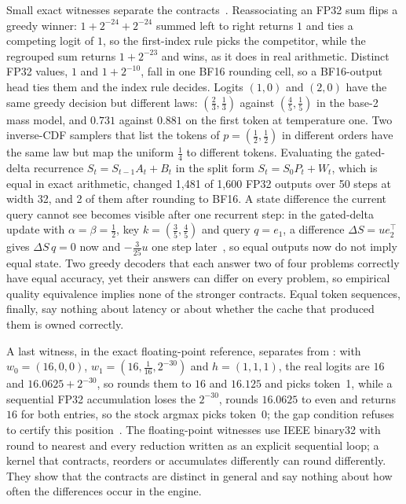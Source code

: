 Small exact witnesses separate the contracts~. Reassociating an FP32 sum flips a greedy winner: $1+2^{-24}+2^{-24}$ summed left to right returns $1$ and ties a competing logit of $1$, so the first-index rule picks the competitor, while the regrouped sum returns $1+2^{-23}$ and wins, as it does in real arithmetic. Distinct FP32 values, $1$ and $1+2^{-10}$, fall in one BF16 rounding cell, so a BF16-output head ties them and the index rule decides. Logits $(1,0)$ and $(2,0)$ have the same greedy decision but different laws: $(\tfrac23,\tfrac13)$ against $(\tfrac45,\tfrac15)$ in the base-2 mass model, and $0.731$ against $0.881$ on the first token at temperature one. Two inverse-CDF samplers that list the tokens of $p=(\tfrac12,\tfrac12)$ in different orders have the same law but map the uniform $\tfrac14$ to different tokens. Evaluating the gated-delta recurrence $S_t=S_{t-1}A_t+B_t$ in the split form $S_t=S_0P_t+W_t$, which is equal in exact arithmetic, changed 1,481 of 1,600 FP32 outputs over 50 steps at width 32, and 2 of them after rounding to BF16. A state difference the current query cannot see becomes visible after one recurrent step: in the gated-delta update with $\alpha=\beta=\tfrac12$, key $k=(\tfrac35,\tfrac45)$ and query $q=e_1$, a difference $\Delta S=ue_2^\top$ gives $\Delta S\,q=0$ now and $-\tfrac{3}{25}u$ one step later~, so equal outputs now do not imply equal state. Two greedy decoders that each answer two of four problems correctly have equal accuracy, yet their answers can differ on every problem, so empirical quality equivalence implies none of the stronger contracts. Equal token sequences, finally, say nothing about latency or about whether the cache that produced them is owned correctly.

A last witness, in the exact floating-point reference, separates \Rbf{} from \Rstock{}: with $w_0=(16,0,0)$, $w_1=(16,\tfrac1{16},2^{-30})$ and $h=(1,1,1)$, the real logits are $16$ and $16.0625+2^{-30}$, so \Rbf{} rounds them to $16$ and $16.125$ and picks token~1, while a sequential FP32 accumulation loses the $2^{-30}$, rounds $16.0625$ to even and returns $16$ for both entries, so the stock argmax picks token~0; the gap condition refuses to certify this position~. The floating-point witnesses use IEEE binary32 with round to nearest and every reduction written as an explicit sequential loop; a kernel that contracts, reorders or accumulates differently can round differently. They show that the contracts are distinct in general and say nothing about how often the differences occur in the engine.

